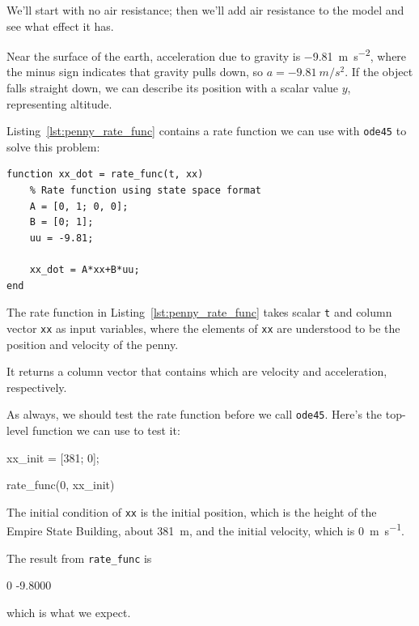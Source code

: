 We'll start with no air resistance; then we'll add air resistance to the model and see what effect it has.


Near the surface of the earth,
acceleration due to gravity is \SI{-9.81}{\meter \per \second \squared}, where the minus sign
indicates that gravity pulls down, so $a=\SI{-9.81}{m/s^2}$.
If the object falls straight down, we can describe its position with a
scalar value $y$, representing altitude.

Listing~\ref{lst:penny_rate_func} contains a rate function we can use with \lstinline{ode45} to solve
this problem:

\begin{lstlisting}[caption={A rate function for the falling penny problem}, label={lst:penny_rate_func}]
function xx_dot = rate_func(t, xx)
    % Rate function using state space format
    A = [0, 1; 0, 0];
    B = [0; 1];
    uu = -9.81;
    
    xx_dot = A*xx+B*uu;
end
\end{lstlisting}

The rate function in Listing~\ref{lst:penny_rate_func} takes scalar \lstinline{t} and column vector \lstinline{xx} as input variables, where the elements of \lstinline{xx} are understood to be the position and velocity of the penny.

It returns a column vector that contains which are velocity and acceleration, respectively.

As always, we should test the rate function before we call \lstinline{ode45}.  Here's the top-level function we can use to test it:

\begin{code}
xx_init = [381; 0];

rate_func(0, xx_init)
\end{code}

The initial condition of \lstinline{xx} is the initial position, which is the height of the Empire State Building, about \SI{381}{\meter}, and the initial velocity, which is \SI{0}{\meter \per \second}.


The result from \lstinline{rate_func} is

\begin{code}
    0
   -9.8000
\end{code}
which is what we expect.

